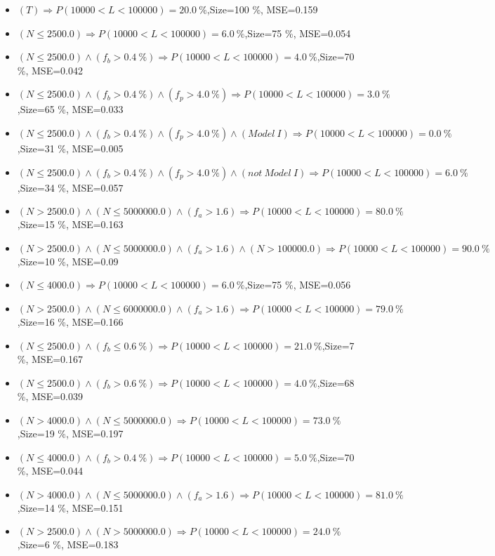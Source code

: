 \documentclass[numbered]{CSL}
\begin{document}
\begin{itemize}
\item $(T) \Rightarrow P(10 000 < L < 100 000) = 20.0~\%$,\hfill Size=100 \%, MSE=0.159
\item $(N \leq 2500.0) \Rightarrow P(10 000 < L < 100 000) = 6.0~\%$,\hfill Size=75 \%, MSE=0.054
\item $(N \leq 2500.0) \land (f_b > 0.4~\%) \Rightarrow P(10 000 < L < 100 000) = 4.0~\%$,\hfill Size=70 \%, MSE=0.042
\item $(N \leq 2500.0) \land (f_b > 0.4~\%) \land (f_p > 4.0~\%) \Rightarrow P(10 000 < L < 100 000) = 3.0~\%$,\hfill Size=65 \%, MSE=0.033
\item $(N \leq 2500.0) \land (f_b > 0.4~\%) \land (f_p > 4.0~\%) \land (Model~I) \Rightarrow P(10 000 < L < 100 000) = 0.0~\%$,\hfill Size=31 \%, MSE=0.005
\item $(N \leq 2500.0) \land (f_b > 0.4~\%) \land (f_p > 4.0~\%) \land (not~Model~I) \Rightarrow P(10 000 < L < 100 000) = 6.0~\%$,\hfill Size=34 \%, MSE=0.057
\item $(N > 2500.0) \land (N \leq 5000000.0) \land (f_a > 1.6) \Rightarrow P(10 000 < L < 100 000) = 80.0~\%$,\hfill Size=15 \%, MSE=0.163
\item $(N > 2500.0) \land (N \leq 5000000.0) \land (f_a > 1.6) \land (N > 100000.0) \Rightarrow P(10 000 < L < 100 000) = 90.0~\%$,\hfill Size=10 \%, MSE=0.09
\item $(N \leq 4000.0) \Rightarrow P(10 000 < L < 100 000) = 6.0~\%$,\hfill Size=75 \%, MSE=0.056
\item $(N > 2500.0) \land (N \leq 6000000.0) \land (f_a > 1.6) \Rightarrow P(10 000 < L < 100 000) = 79.0~\%$,\hfill Size=16 \%, MSE=0.166
\item $(N \leq 2500.0) \land (f_b \leq 0.6~\%) \Rightarrow P(10 000 < L < 100 000) = 21.0~\%$,\hfill Size=7 \%, MSE=0.167
\item $(N \leq 2500.0) \land (f_b > 0.6~\%) \Rightarrow P(10 000 < L < 100 000) = 4.0~\%$,\hfill Size=68 \%, MSE=0.039
\item $(N > 4000.0) \land (N \leq 5000000.0) \Rightarrow P(10 000 < L < 100 000) = 73.0~\%$,\hfill Size=19 \%, MSE=0.197
\item $(N \leq 4000.0) \land (f_b > 0.4~\%) \Rightarrow P(10 000 < L < 100 000) = 5.0~\%$,\hfill Size=70 \%, MSE=0.044
\item $(N > 4000.0) \land (N \leq 5000000.0) \land (f_a > 1.6) \Rightarrow P(10 000 < L < 100 000) = 81.0~\%$,\hfill Size=14 \%, MSE=0.151
\item $(N > 2500.0) \land (N > 5000000.0) \Rightarrow P(10 000 < L < 100 000) = 24.0~\%$,\hfill Size=6 \%, MSE=0.183

\end{itemize}
\end{document}
